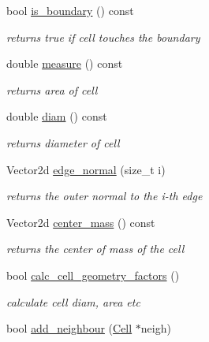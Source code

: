 \begin{DoxyCompactItemize}
bool \hyperlink{group__Mesh_ga710ded03b7741c8377e0b2dda2395b46}{is\+\_\+boundary} () const
\begin{DoxyCompactList}\small\item\em returns true if cell touches the boundary \end{DoxyCompactList}\item 
double \hyperlink{group__Mesh_gac19ec98507a18d255bd54b1e55b16653}{measure} () const
\begin{DoxyCompactList}\small\item\em returns area of cell \end{DoxyCompactList}\item 
double \hyperlink{group__Mesh_ga84c743487088ebb64ca0c860329c7162}{diam} () const
\begin{DoxyCompactList}\small\item\em returns diameter of cell \end{DoxyCompactList}\item 
\mbox{\label{classHArDCore2D_1_1Cell_af55d7a602439110ebbb3c9aee1895580}} 
Vector2d \hyperlink{classHArDCore2D_1_1Cell_af55d7a602439110ebbb3c9aee1895580}{edge\+\_\+normal} (size\+\_\+t i)
\begin{DoxyCompactList}\small\item\em returns the outer normal to the i-\/th edge \end{DoxyCompactList}\item 
Vector2d \hyperlink{group__Mesh_ga66b278b12266d5c5bfee8699886cc89b}{center\+\_\+mass} () const
\begin{DoxyCompactList}\small\item\em returns the center of mass of the cell \end{DoxyCompactList}\item 
\mbox{\label{classHArDCore2D_1_1Cell_a6dfa6d2f4a0c971bc760538b73880a1c}} 
bool \hyperlink{classHArDCore2D_1_1Cell_a6dfa6d2f4a0c971bc760538b73880a1c}{calc\+\_\+cell\+\_\+geometry\+\_\+factors} ()
\begin{DoxyCompactList}\small\item\em calculate cell diam, area etc \end{DoxyCompactList}\item 
\mbox{\label{classHArDCore2D_1_1Cell_a6e29b140b5f4a286ed694f2851fe76e1}} 
bool \hyperlink{classHArDCore2D_1_1Cell_a6e29b140b5f4a286ed694f2851fe76e1}{add\+\_\+neighbour} (\hyperlink{classHArDCore2D_1_1Cell}{Cell} $\ast$neigh)

\end{DoxyCompactItemize}
